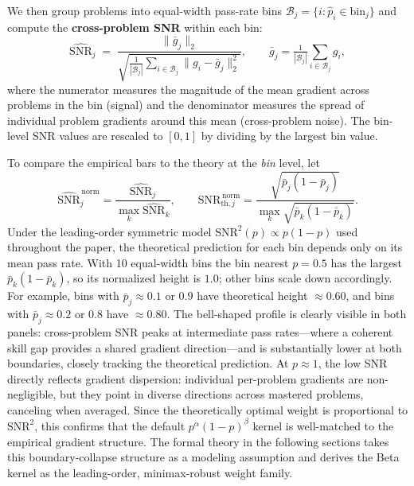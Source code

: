 \documentclass{article}
\begin{document}
We then group problems into equal-width pass-rate bins $\mathcal{B}_j = \{i : \hat{p}_i \in \text{bin}_j\}$ and compute the \textbf{cross-problem SNR} within each bin:
\begin{equation}
  \widehat{\text{SNR}}_j \;=\; \frac{\|\bar{g}_j\|_2}{\sqrt{\frac{1}{|\mathcal{B}_j|}\sum_{i \in \mathcal{B}_j}\|g_i - \bar{g}_j\|_2^2}}, \qquad \bar{g}_j = \tfrac{1}{|\mathcal{B}_j|}\textstyle\sum_{i \in \mathcal{B}_j} g_i,
\end{equation}
where the numerator measures the magnitude of the mean gradient across problems in the bin (signal) and the denominator measures the spread of individual problem gradients around this mean (cross-problem noise). The bin-level SNR values are rescaled to $[0,1]$ by dividing by the largest bin value.

To compare the empirical bars to the theory at the \emph{bin} level, let
\begin{equation}
  \widehat{\text{SNR}}_j^{\,\mathrm{norm}} = \frac{\widehat{\text{SNR}}_j}{\max_k \widehat{\text{SNR}}_k}, \qquad
  \text{SNR}_{\mathrm{th},j}^{\,\mathrm{norm}} = \frac{\sqrt{\bar{p}_j(1-\bar{p}_j)}}{\max_k \sqrt{\bar{p}_k(1-\bar{p}_k)}}.
  \label{eq:snr_normalization}
\end{equation}
Under the leading-order symmetric model $\text{SNR}^2(p) \propto p(1-p)$ used throughout the paper, the theoretical prediction for each bin depends only on its mean pass rate. With 10 equal-width bins the bin nearest $p=0.5$ has the largest $\bar{p}_k(1-\bar{p}_k)$, so its normalized height is $1.0$; other bins scale down accordingly. For example, bins with $\bar{p}_j \approx 0.1$ or $0.9$ have theoretical height $\approx 0.60$, and bins with $\bar{p}_j \approx 0.2$ or $0.8$ have $\approx 0.80$. The bell-shaped profile is clearly visible in both panels: cross-problem SNR peaks at intermediate pass rates---where a coherent skill gap provides a shared gradient direction---and is substantially lower at both boundaries, closely tracking the theoretical prediction. At $p \approx 1$, the low SNR directly reflects gradient dispersion: individual per-problem gradients are non-negligible, but they point in diverse directions across mastered problems, canceling when averaged. Since the theoretically optimal weight is proportional to $\text{SNR}^2$, this confirms that the default $p^\alpha(1{-}p)^\beta$ kernel is well-matched to the empirical gradient structure. The formal theory in the following sections takes this boundary-collapse structure as a modeling assumption and derives the Beta kernel as the leading-order, minimax-robust weight family.
\end{document}
